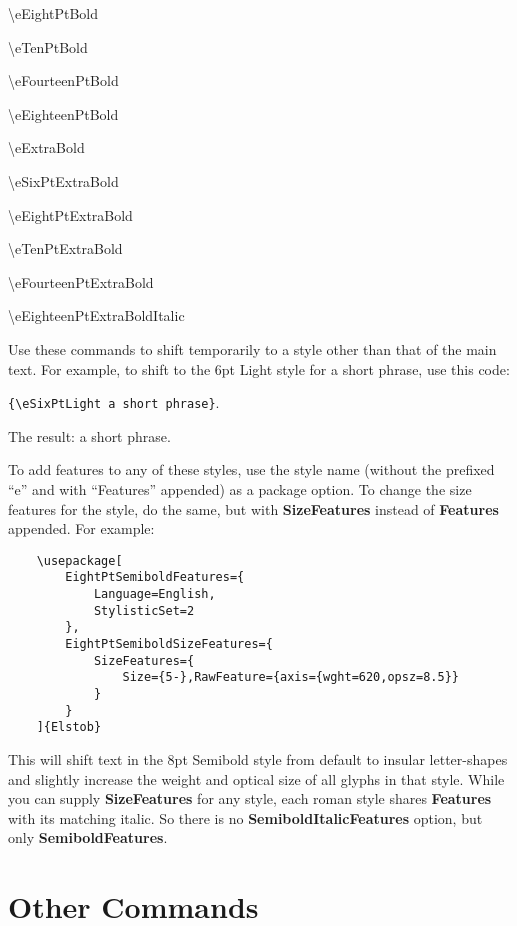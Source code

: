 \documentclass[12pt]{article}
\begin{document}
\begin{multicols}{2}
\noindent\textbackslash eEightPtBold

\noindent\textbackslash eTenPtBold

\noindent\textbackslash eFourteenPtBold

\noindent\textbackslash eEighteenPtBold

\noindent\textbackslash eExtraBold

\noindent\textbackslash eSixPtExtraBold

\noindent\textbackslash eEightPtExtraBold

\noindent\textbackslash eTenPtExtraBold

\noindent\textbackslash eFourteenPtExtraBold

\noindent\textbackslash eEighteenPtExtraBoldItalic
\end{multicols}

\noindent Use these commands
to shift temporarily to a style other than that of the main text.
For example, to shift to the 6pt Light style for a short phrase, use
this code:
\begin{center}
{\small\verb|{\eSixPtLight a short phrase}|}.
\end{center}
The result: {\eSixPtLight a short phrase}.

To add features to any of these styles, use the style name
(without the prefixed “e” and with “Features” appended)
as a package option. To change the size features for the style,
do the same, but with \textbf{SizeFeatures} instead of \textbf{Features}
appended. For example:

\footnotesize
\begin{verbatim}
    \usepackage[
        EightPtSemiboldFeatures={
            Language=English,
            StylisticSet=2
        },
        EightPtSemiboldSizeFeatures={
            SizeFeatures={
                Size={5-},RawFeature={axis={wght=620,opsz=8.5}}
            }
        }
    ]{Elstob}
\end{verbatim}\normalsize

\noindent This will shift text in the 8pt Semibold style from default to insular
letter-shapes and slightly increase the weight and optical size of all glyphs in that style.
While you can supply \textbf{SizeFeatures} for any style, each roman style shares
\textbf{Features} with its matching italic. So there is no \textbf{SemiboldItalicFeatures}
option, but only \textbf{SemiboldFeatures}.

\section{Other Commands}
\end{document}
